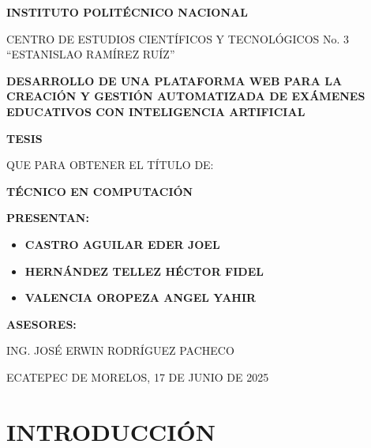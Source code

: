 \documentclass[12pt,a4paper]{report}
\begin{document}
\begin{titlepage}
\thispagestyle{titlepage}
\centering

\vspace*{1cm}

{\Large \textbf{INSTITUTO POLITÉCNICO NACIONAL}}

\vspace{0.5cm}

{\large CENTRO DE ESTUDIOS CIENTÍFICOS Y TECNOLÓGICOS No. 3 ``ESTANISLAO RAMÍREZ RUÍZ''}

\vspace{2cm}

{\LARGE \textbf{DESARROLLO DE UNA PLATAFORMA WEB PARA LA CREACIÓN Y GESTIÓN AUTOMATIZADA DE EXÁMENES EDUCATIVOS CON INTELIGENCIA ARTIFICIAL}}

\vspace{2cm}

{\Large \textbf{TESIS}}

\vspace{0.5cm}

{\large QUE PARA OBTENER EL TÍTULO DE:}

{\Large \textbf{TÉCNICO EN COMPUTACIÓN}}

\vspace{1.5cm}

{\large \textbf{PRESENTAN:}}

\vspace{0.5cm}

\begin{itemize}
\item \textbf{CASTRO AGUILAR EDER JOEL}
\item \textbf{HERNÁNDEZ TELLEZ HÉCTOR FIDEL}
\item \textbf{VALENCIA OROPEZA ANGEL YAHIR}
\end{itemize}

\vspace{1cm}

{\large \textbf{ASESORES:}}

{\large ING. JOSÉ ERWIN RODRÍGUEZ PACHECO}

\vfill

{\large ECATEPEC DE MORELOS, 17 DE JUNIO DE 2025}

\end{titlepage}

\thispagestyle{titlepage}
\tableofcontents
\newpage

\chapter*{INTRODUCCIÓN}
\end{document}
